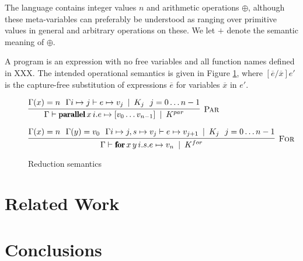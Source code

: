 \documentclass[natbib]{sigplanconf}
\newcommand{\kw}[1]{\mbox{\fontfamily{cmr}\fontseries{b}\selectfont#1}}
\newcommand{\hinfer}[3]{\vcenter{\infer[\DT{#1}]{#2}{#3}}}
\newcommand{\ENV}{\Gamma}
\newcommand{\beval}{\mapsto} %
\newcommand{\ent}{\vdash}
\newcommand{\cost}{\alt}
\newcommand{\spacer}{\,\,\,\,} %
\newcommand{\DT}[1]{\mbox{\sc #1}}
\newcommand{\alt}{\;\:\vert\;\:}
\newcommand{\KPAR}{K^{par}}
\newcommand{\KFOR}{K^{for}}
\newcommand{\K}[1]{K_{#1}}
\newcommand{\PARALLEL}{\kw{parallel}\,}
\newcommand{\FOR}{\kw{for}\,}
\newcommand{\ARRAY}[1]{[#1]}
\begin{document}
The language contains integer values $n$ and arithmetic
operations $\oplus$, although these meta-variables can preferably be
understood as ranging over primitive values in general and arbitrary
operations on these. We let $+$ denote the semantic meaning of
$\oplus$.

A program is an expression with no free variables and all function
names defined in XXX.  The intended operational
semantics is given in Figure \ref{fig:redsem}, where
$[\overline{e}/\overline{x}]e'$ is the capture-free substitution of
expressions $\overline{e}$ for variables $\overline{x}$ in $e'$.

\begin{figure}
$\hinfer{Par}{\ENV \ent \PARALLEL x\,i.e \beval \ARRAY{v_0\ldots v_{n-1}} \cost \KPAR}{\ENV(x) = n \spacer \ENV {i \mapsto j} \ent e \beval v_j \cost \K{j} \spacer j=0\ldots n-1}$

$\hinfer{For}{\ENV \ent \FOR x\,y\, i.s.e \beval v_n \cost \KFOR}{\ENV(x) = n \spacer \ENV(y) = v_0 \spacer \ENV {i \mapsto j, s \mapsto v_j} \ent e \beval v_{j+1} \cost \K{j} \spacer j=0\ldots n-1}$
\caption{Reduction semantics}
\label{fig:redsem}
\end{figure}

\section{Related Work}

\section{Conclusions}

\acks





\end{document}
